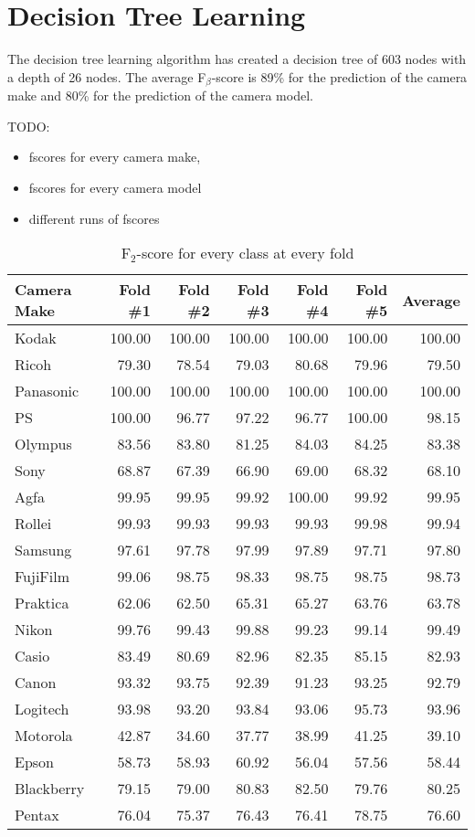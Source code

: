 \section{Decision Tree Learning}
The decision tree learning algorithm has created a decision tree of 603 nodes with a depth of 26 nodes. The average F$_\beta$-score is 89\% for the prediction of the camera make and 80\% for the prediction of the camera model. %

TODO:
\begin{itemize}
\item fscores for every camera make,
\item fscores for every camera model
\item different runs of fscores
\end{itemize}

\begin{table}[h]
\begin{tabular}{|l|r|r|r|r|r|r|}
\hline
\textbf{Camera Make} & \textbf{Fold \#1} & \textbf{Fold \#2} & \textbf{Fold \#3} & \textbf{Fold \#4} & \textbf{Fold \#5} & \textbf{Average}\\
\hline
Kodak & 100.00 &100.00 &100.00 &100.00 &100.00 & 100.00\\
Ricoh & 79.30 &78.54 &79.03 &80.68 &79.96 & 79.50\\
Panasonic & 100.00 &100.00 &100.00 &100.00 &100.00 & 100.00\\
PS & 100.00 &96.77 &97.22 &96.77 &100.00 & 98.15\\
Olympus & 83.56 &83.80 &81.25 &84.03 &84.25 & 83.38\\
Sony & 68.87 &67.39 &66.90 &69.00 &68.32 & 68.10\\
Agfa & 99.95 &99.95 &99.92 &100.00 &99.92 & 99.95\\
Rollei & 99.93 &99.93 &99.93 &99.93 &99.98 & 99.94\\
Samsung & 97.61 &97.78 &97.99 &97.89 &97.71 & 97.80\\
FujiFilm & 99.06 &98.75 &98.33 &98.75 &98.75 & 98.73\\
Praktica & 62.06 &62.50 &65.31 &65.27 &63.76 & 63.78\\
Nikon & 99.76 &99.43 &99.88 &99.23 &99.14 & 99.49\\
Casio & 83.49 &80.69 &82.96 &82.35 &85.15 & 82.93\\
Canon & 93.32 &93.75 &92.39 &91.23 &93.25 & 92.79\\
Logitech & 93.98 &93.20 &93.84 &93.06 &95.73 & 93.96\\
Motorola & 42.87 &34.60 &37.77 &38.99 &41.25 & 39.10\\
Epson & 58.73 &58.93 &60.92 &56.04 &57.56 & 58.44\\
Blackberry & 79.15 &79.00 &80.83 &82.50 &79.76 & 80.25\\
Pentax & 76.04 &75.37 &76.43 &76.41 &78.75 & 76.60\\
\hline
\end{tabular}
\caption{F$_2$-score for every class at every fold}
\label{tab:fscore_everyclass}
\end{table}



